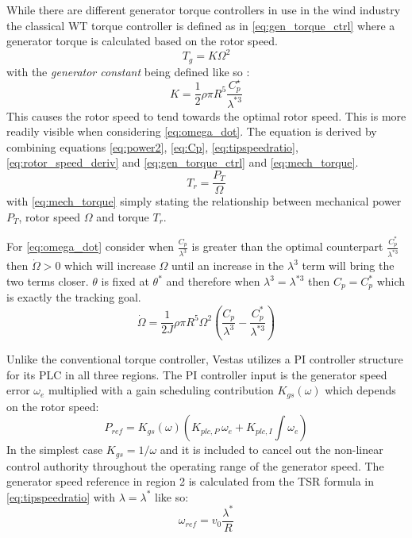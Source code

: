 While there are different generator torque controllers in use in the wind industry the classical WT torque controller is defined as in \cref{eq:gen_torque_ctrl} where a generator torque is calculated based on the rotor speed.
\begin{equation}\label{eq:gen_torque_ctrl}
	T_g = K \Omega^2
\end{equation}
with the \textit{generator constant} being defined like so \cite{Pao2009}:
\begin{equation}\label{eq:gen_torque_const}
	K = \dfrac{1}{2} \rho \pi R^5 \dfrac{C_p^\star}{\lambda^{*3}}
\end{equation}
This causes the rotor speed to tend towards the optimal rotor speed. This is more readily visible when considering \cref{eq:omega_dot}. The equation is derived by combining equations \cref{eq:power2}, \cref{eq:Cp}, \cref{eq:tipspeedratio}, \cref{eq:rotor_speed_deriv} and \cref{eq:gen_torque_ctrl} and \cref{eq:mech_torque}.
\begin{equation}\label{eq:mech_torque}
	T_r = \dfrac{P_T}{\Omega}
\end{equation}
with \cref{eq:mech_torque} simply stating the relationship between mechanical power $ P_T $, rotor speed $ \Omega $ and torque $ T_r $.

For \cref{eq:omega_dot} consider when $ \frac{C_p}{\lambda^3} $ is greater than the optimal counterpart $ \frac{C_p^*}{\lambda^{*3}} $ then $ \dot{\Omega} > 0 $ which will increase $ \Omega $ until an increase in the $ \lambda^3 $ term will bring the two terms closer. $ \theta $ is fixed at $ \theta^* $ and therefore when $ \lambda^3 = \lambda^{*3} $ then $ C_p = C_p^* $ which is exactly the tracking goal.
\begin{equation}\label{eq:omega_dot}
	\dot{\Omega} = \dfrac{1}{2 J} \rho \pi R^5 \Omega^2 \left( \dfrac{C_p}{\lambda^3} - \dfrac{C_p^*}{\lambda^{*3}} \right)
\end{equation}


\medskip
Unlike the conventional torque controller, Vestas utilizes a PI controller structure for its PLC in all three regions. The PI controller input is the generator speed error $ \omega_e $ multiplied with a gain scheduling contribution $ K_{gs}(\omega) $ which depends on the rotor speed:
\begin{equation}\label{eq:pi_plc_ctrl}
	P_{ref} = K_{gs}(\omega) \left(K_{plc,P} \, \omega_e + K_{plc,I} \int \omega_e\right)
\end{equation}
In the simplest case $ K_{gs} = 1/\omega $ and it is included to cancel out the non-linear control authority throughout the operating range of the generator speed.
The generator speed reference in region 2 is calculated from the TSR formula in \cref{eq:tipspeedratio} with $ \lambda = \lambda^* $ like so:
\begin{equation}\label{eq:omega_ref_from_tsr}
	\omega_{ref} = v_0 \dfrac{\lambda^*}{R}
\end{equation} 

